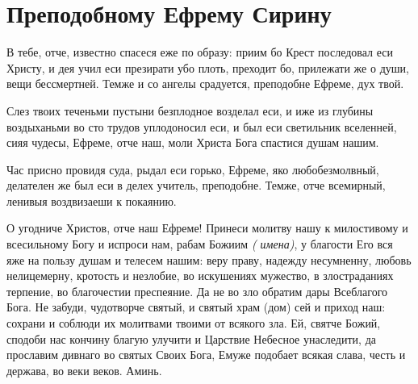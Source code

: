 \begin{mymulticols}
\end{mymulticols}

\section{Преподобному Ефрему Сирину}\begin{mymulticols}


В тебе, отче, известно спасеся еже по образу: приим бо Крест последовал еси Христу, и дея учил еси презирати убо плоть, преходит бо, прилежати же о души, вещи бессмертней. Темже и со ангелы срадуется, преподобне Ефреме, дух твой.


Слез твоих теченьми пустыни безплодное возделал еси, и иже из глубины воздыханьми во сто трудов уплодоносил еси, и был еси светильник вселенней, сияя чудесы, Ефреме, отче наш, моли Христа Бога спастися душам нашим.


Час присно провидя суда, рыдал еси горько, Ефреме, яко любобезмолвный, делателен же был еси в делех учитель, преподобне. Темже, отче всемирный, ленивыя воздвизаеши к покаянию.


О угодниче Христов, отче наш Ефреме! Принеси молитву нашу к милостивому и всесильному Богу и испроси нам, рабам Божиим {\itshape( имена)}, у благости Его вся яже на пользу душам и телесем нашим: веру праву, надежду несумненну, любовь нелицемерну, кротость и незлобие, во искушениях мужество, в злостраданиях терпение, во благочестии преспеяние. Да не во зло обратим дары Всеблагого Бога. Не забуди, чудотворче святый, и святый храм (дом) сей и приход наш: сохрани и соблюди их молитвами твоими от всякого зла. Ей, святче Божий, сподоби нас кончину благую улучити и Царствие Небесное унаследити, да прославим дивнаго во святых Своих Бога, Емуже подобает всякая слава, честь и держава, во веки веков. Аминь.

\end{mymulticols}

